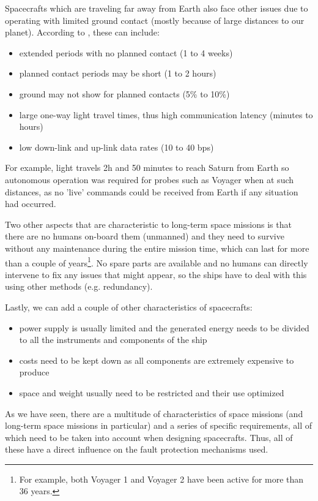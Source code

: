 Spacecrafts which are traveling far away from Earth also face other issues due
to operating with limited ground contact (mostly because of large distances to
our planet). According to \cite{fm-jpl}, these can include:
\begin{itemize}
  \item extended periods with no planned contact (1 to 4 weeks)
  \item planned contact periods may be short (1 to 2 hours)
  \item ground may not show for planned contacts (5\% to 10\%)
  \item large one-way light travel times, thus high communication latency
  (minutes to hours)
  \item low down-link and up-link data rates (10 to 40 bps)
\end{itemize}
For example, light travels 2h and 50 minutes to reach Saturn from Earth so
autonomous operation was required for probes such as Voyager when at such
distances, as no 'live' commands could be received from Earth if any situation
had occurred.

Two other aspects that are characteristic to long-term space missions is that
there are no humans on-board them (unmanned) and they need to survive without any
maintenance during the entire mission time, which can last for more than a
couple of years\footnote{For example, both Voyager 1 and Voyager 2 have been
active for more than 36 years.}. No spare parts are available and no humans can
directly intervene to fix any issues that might appear, so the ships have to
deal with this using other methods (e.g. redundancy).

Lastly, we can add a couple of other characteristics of spacecrafts:
\begin{itemize}
  \item power supply is usually limited and the generated energy needs to be
  divided to all the instruments and components of the ship
  \item costs need to be kept down as all components are extremely expensive to
  produce
  \item space and weight usually need to be restricted and their use optimized
\end{itemize}

As we have seen, there are a multitude of characteristics of space missions (and
long-term space missions in particular) and a series of specific requirements,
all of which need to be taken into account when designing spacecrafts. Thus, all
of these have a direct influence on the fault protection mechanisms used.
